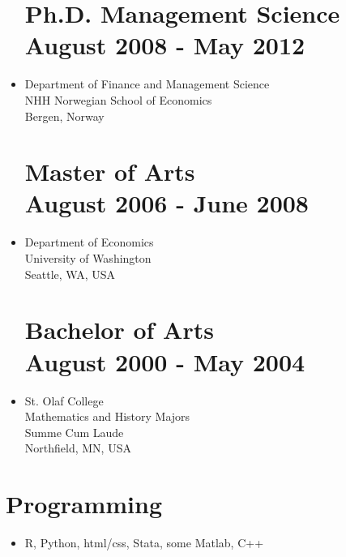 \documentclass[margin]{res}
\begin{document}
\begin{itemize}
\normalsize{\section{Ph.D. Management Science \\ August 2008 - May 2012}}
\item[] Department of Finance and Management Science\\
NHH Norwegian School of Economics \\
Bergen, Norway \\

\normalsize{\section{\bf Master of Arts \\ August 2006 - June 2008}}
\item[] Department of Economics \\
University of Washington \\
Seattle, WA, USA \\

\normalsize{\section{\bf Bachelor of Arts \\ August 2000 - May 2004}}
\item[] St. Olaf College  \\
Mathematics and History Majors \\
Summe Cum Laude \\
Northfield, MN, USA \\
\end{itemize}


\section{Programming}
\begin{itemize}
  \item[] R, Python, html/css, Stata, some Matlab, C++
\end{itemize}
\end{document}
